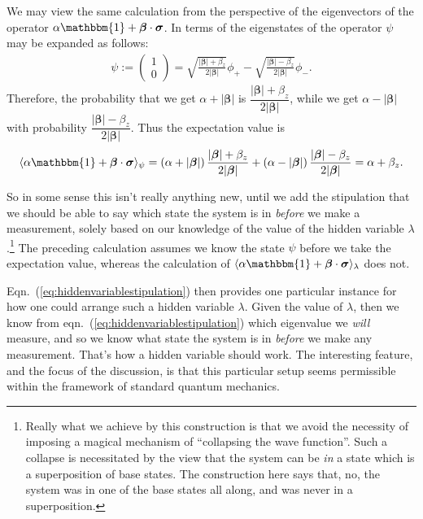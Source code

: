 \documentclass[12pt]{article}
\begin{document}
We may view the same calculation from the perspective of the
eigenvectors of the operator $\alpha \mathbbm{1}
+\bm{\beta}\cdot\bm{\sigma}$.  In terms of the eigenstates of the operator
$\psi$ may be expanded as follows:
\begin{align*}
  \psi
  :=
  \begin{pmatrix}
    1\\
    0
  \end{pmatrix}
  = \sqrt{\frac{|\bm{\beta}|+\beta_z}{2|\bm{\beta}|}}\phi_{+} - \sqrt{\frac{|\bm{\beta}|-\beta_z}{2|\bm{\beta}|}}\phi_{-}.
\end{align*}
Therefore, the probability that we get $\alpha+|\bm{\beta}|$ is $\dfrac{|\bm{\beta}|+\beta_z}{2|\bm{\beta}|}$, while we get $\alpha-|\bm{\beta}|$ with probability $\dfrac{|\bm{\beta}|-\beta_z}{2|\bm{\beta}|}$.
Thus the expectation value is
\begin{align*}
  \langle \alpha \mathbbm{1} + \bm{\beta} \cdot \bm{\sigma} \rangle_{\psi}
  = \left( \alpha+|\bm{\beta}| \right) \dfrac{|\bm{\beta}|+\beta_z}{2|\bm{\beta}|} + \left( \alpha-|\bm{\beta}| \right) \dfrac{|\bm{\beta}|-\beta_z}{2|\bm{\beta}|}
  = \alpha + \beta_z.
\end{align*}

So in some sense this isn't really anything new, until we add the stipulation that we should be able to say which state the system is in \emph{before} we make a measurement, solely based on our knowledge of the value of the hidden variable $\lambda$.\footnote{Really what we achieve by this construction is that we avoid the necessity of imposing a magical mechanism of ``collapsing the wave function''. Such a collapse is necessitated by the view that the system can be \emph{in} a state which is a superposition of base states. The construction here says that, no, the system was in one of the base states all along, and was never in a superposition.} The preceding calculation assumes we know the state $\psi$ before we take the expectation value, whereas the calculation of $\langle \alpha \mathbbm{1} + \bm{\beta} \cdot \bm{\sigma} \rangle_{\lambda}$ does not.

Eqn.~(\ref{eq:hiddenvariablestipulation}) then provides one particular instance for how one could arrange such a hidden variable $\lambda$. Given the value of $\lambda$, then we know from eqn.~(\ref{eq:hiddenvariablestipulation}) which eigenvalue we \emph{will} measure, and so we know what state the system is in \emph{before} we make any measurement. That's how a hidden variable should work. The interesting feature, and the focus of the discussion, is that this particular setup seems permissible within the framework of standard quantum mechanics.
\end{document}
